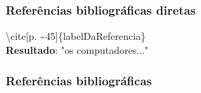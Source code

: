 	\begin{frame}
		\frametitle{Refer\^{e}ncias bibliogr\'{a}ficas diretas}
		\textbackslash cite[p. \~{}45]\{labelDaReferencia\} \\
		\textbf{Resultado}: "os computadores..." \cite[p.~45]{tanebaun2010} 
	\end{frame}	

	\begin{frame}
		\frametitle{Refer\^{e}ncias bibliogr\'{a}ficas}
		
	\end{frame}

